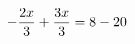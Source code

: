 \documentclass[preview]{standalone}
\begin{document}
\begin{align*}
\special{dvisvgm:raw <g id='unique000'>}- \frac{2 x}{3} + \frac{3 x}{3} = 8 - 20\special{dvisvgm:raw </g>}
\end{align*}
\end{document}
